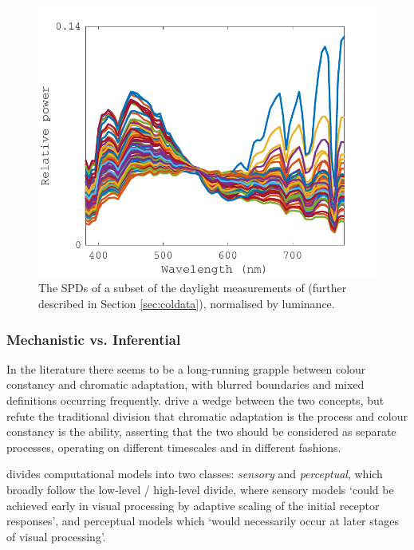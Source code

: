 \begin{figure}[htbp]
\includegraphics[max width=\textwidth]{figs/LitRev/ColorimetryDemo7.pdf}
\caption{The \glspl{SPD} of a subset of the daylight measurements of \citet{hernandez-andres_color_2001} (further described in Section \ref{sec:coldata}), normalised by luminance.}
\label{fig:SPDnorm}
\end{figure}

\subsubsection{Mechanistic vs. Inferential}

In the literature there seems to be a long-running grapple between colour constancy and chromatic adaptation, with blurred boundaries and mixed definitions occurring frequently. \citet{brill_chromatic_1986} drive a wedge between the two concepts, but refute the traditional division that chromatic adaptation is the process and colour constancy is the ability, asserting that the two should be considered as separate processes, operating on different timescales and in different fashions.

\citet{hurlbert_computational_1998} divides computational models into two classes: \emph{sensory} and \emph{perceptual}, which broadly follow the low-level / high-level divide, where sensory models `could be achieved early in visual processing by adaptive scaling of the initial receptor responses', and perceptual models which `would necessarily occur at later stages of visual processing'.


